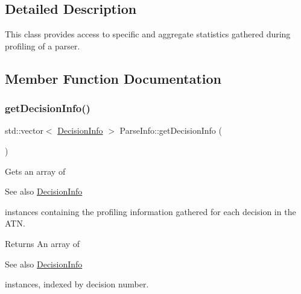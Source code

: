 \subsection{Detailed Description}
This class provides access to specific and aggregate statistics gathered during profiling of a parser. 

\subsection{Member Function Documentation}
\mbox{\label{classantlr4_1_1atn_1_1ParseInfo_a637a7b2c52ca5cd2a3f247ba5de623f7}} 
\subsubsection{\texorpdfstring{get\+Decision\+Info()}{getDecisionInfo()}}
{\footnotesize\ttfamily std\+::vector$<$ \hyperlink{classantlr4_1_1atn_1_1DecisionInfo}{Decision\+Info} $>$ Parse\+Info\+::get\+Decision\+Info (\begin{DoxyParamCaption}{ }\end{DoxyParamCaption})\hspace{0.3cm}{\ttfamily [virtual]}}



Gets an array of \begin{DoxySeeAlso}{See also}
\hyperlink{classantlr4_1_1atn_1_1DecisionInfo}{Decision\+Info}


\end{DoxySeeAlso}
instances containing the profiling information gathered for each decision in the A\+TN. 

\begin{DoxyReturn}{Returns}
An array of \begin{DoxySeeAlso}{See also}
\hyperlink{classantlr4_1_1atn_1_1DecisionInfo}{Decision\+Info}


\end{DoxySeeAlso}
instances, indexed by decision number. 
\end{DoxyReturn}
\mbox{\label{classantlr4_1_1atn_1_1ParseInfo_a7b0cb79517c02b88f2c88a668461f359}} 
